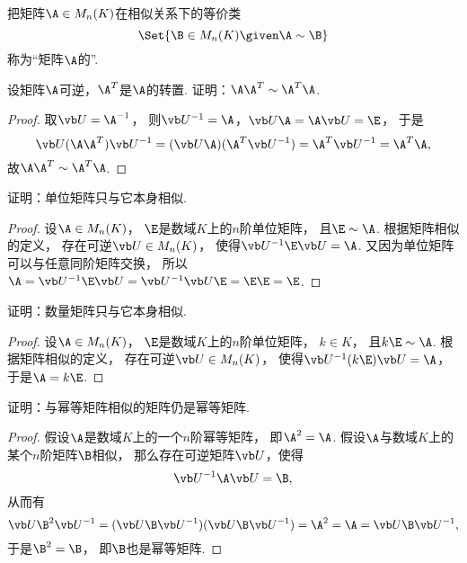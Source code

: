\begin{definition}
把矩阵\(\A \in M_n(K)\)在相似关系下的等价类\[
	\Set{ \B \in M_n(K) \given \A\sim\B }
\]称为“矩阵\(\A\)的”.
\end{definition}

\begin{example}
设矩阵\(\A\)可逆，\(\A^T\)是\(\A\)的转置.
证明：\(\A\A^T \sim \A^T\A\).
\begin{proof}
取\(\P=\A^{-1}\)，
则\(\P^{-1}=\A\)，\(\P\A=\A\P=\E\)，
于是\[
	\P(\A\A^T)\P^{-1}
	= (\P\A)(\A^T\P^{-1})
	= \A^T\P^{-1}
	= \A^T\A,
\]
故\(\A\A^T \sim \A^T\A\).
\end{proof}
\end{example}
\begin{example}
证明：单位矩阵只与它本身相似.
\begin{proof}
设\(\A \in M_n(K)\)，
\(\E\)是数域\(K\)上的\(n\)阶单位矩阵，
且\(\E \sim \A\).
根据矩阵相似的定义，
存在可逆\(\P \in M_n(K)\)，
使得\(\P^{-1} \E \P = \A\).
又因为单位矩阵可以与任意同阶矩阵交换，
所以\(\A
= \P^{-1} \E \P
= \P^{-1} \P \E
= \E \E
= \E\).
\end{proof}
\end{example}
\begin{example}
证明：数量矩阵只与它本身相似.
\begin{proof}
设\(\A \in M_n(K)\)，
\(\E\)是数域\(K\)上的\(n\)阶单位矩阵，
\(k \in K\)，
且\(k\E \sim \A\).
根据矩阵相似的定义，
存在可逆\(\P \in M_n(K)\)，
使得\(\P^{-1} (k\E) \P = \A\)，
于是\(\A = k\E\).
\end{proof}
\end{example}
\begin{example}
证明：与幂等矩阵相似的矩阵仍是幂等矩阵.
\begin{proof}
假设\(\A\)是数域\(K\)上的一个\(n\)阶幂等矩阵，
即\(\A^2=\A\).
假设\(\A\)与数域\(K\)上的某个\(n\)阶矩阵\(\B\)相似，
那么存在可逆矩阵\(\P\)，使得\[
	\P^{-1}\A\P = \B,
\]
从而有\[
	\P\B^2\P^{-1}
	= (\P\B\P^{-1})(\P\B\P^{-1})
	= \A^2
	= \A
	= \P\B\P^{-1},
\]
于是\(\B^2=\B\)，
即\(\B\)也是幂等矩阵.
\end{proof}
\end{example}

